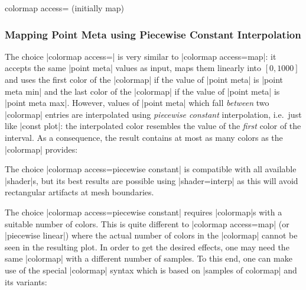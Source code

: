\begin{pgfplotskey}{colormap access= (initially map)}
	\subsubsection{Mapping Point Meta using Piecewise Constant Interpolation}
	The choice |colormap access=| is very similar to |colormap access=map|: it accepts the same |point meta| values as input, maps them linearly into $[0,1000]$ and uses the first color of the |colormap| if the value of |point meta| is |point meta min| and the last color of the |colormap| if the value of |point meta| is |point meta max|. However, values of |point meta| which fall \emph{between} two |colormap| entries are interpolated using \emph{piecewise constant} interpolation, i.e.\ just like |const plot|: the interpolated color resembles the value of the \emph{first} color of the interval. As a consequence, the result contains at most  as many colors as the |colormap| provides:
\begin{codeexample}[]
\end{codeexample}
	The choice |colormap access=piecewise constant| is compatible with all available |shader|s, but its best results are possible using |shader=interp| as this will avoid rectangular artifacts at mesh boundaries.
\begin{codeexample}[]
\end{codeexample}

	The choice |colormap access=piecewise constant| requires |colormap|s with a suitable number of colors. This is quite different to |colormap access=map| (or |piecewise linear|) where the actual number of colors in the |colormap| cannot be seen in the resulting plot. In order to get the desired effects, one may need the same |colormap| with a different number of samples. To this end, one can make use of the special |colormap| syntax which is based on |samples of colormap| and its variants:


\end{pgfplotskey}
